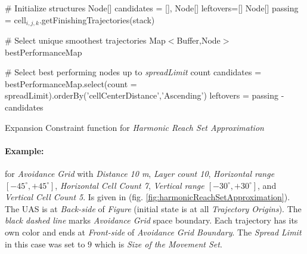 \begin{algorithm}[H]
    
    \BlankLine
    \# Initialize structures\;
    Node[] candidates = [], Node[] leftovers=[]\;
    Node[] passing = cell$_{i,j,k}$.getFinishingTrajectories(stack)\;
    
    \BlankLine
    \# Select unique smoothest trajectories\;
    Map$<$Buffer,Node$>$  bestPerformanceMap\;
    \For{Node test $\in$ passing}{
        centerDistance= test.getPerformance(cell$_{i,j,k}$)]\;
        footPrint = test.getFootprint()\;
        \eIf{bestPerformanceMap.contains(footPrint)}{
            old = bestPerformanceMap.getByKey(footprint)\;
            oldPerformance= old.getPerformance(cell$_{i,j,k}$)\;
            \If{oldPerformance $>$ centerDistance}{
                bestPerformanceMap.setByKey(footprint,test)\;         
            }
        }{
            bestPerformanceMap.setByKey(footprint,test)\;
        }
    }
    
    \BlankLine
    \# Select best performing nodes up to \emph{spreadLimit} count\;
    candidates = bestPerformanceMap.select(count = spreadLimit).orderBy('cellCenterDistance','Ascending')\;
    leftovers = passing - candidates\;
    
    
    \caption{Expansion Constraint function for \emph{Harmonic Reach Set Approximation}}
    \label{alg:ExpansionConstraintFunctionForHarmonicReachSet}    
\end{algorithm}


\paragraph{Example:} for \emph{Avoidance Grid} with \emph{Distance 10 m}, \emph{Layer count 10}, \emph{Horizontal range $[-45^\circ,+45^\circ]$}, \emph{Horizontal Cell Count 7}, \emph{Vertical range $[-30^\circ,+30^\circ]$}, and \emph{Vertical Cell Count 5}. Is given in (fig. \ref{fig:harmonicReachSetApproximation}). The UAS is at \emph{Back-side} of \emph{Figure} (initial state is at all \emph{Trajectory Origins}). The \emph{black dashed line} marks \emph{Avoidance Grid} space boundary. Each trajectory has its own color and ends at \emph{Front-side} of \emph{Avoidance Grid Boundary}. The \emph{Spread Limit} in this case was set to $9$ which is \emph{Size of the Movement Set}.

